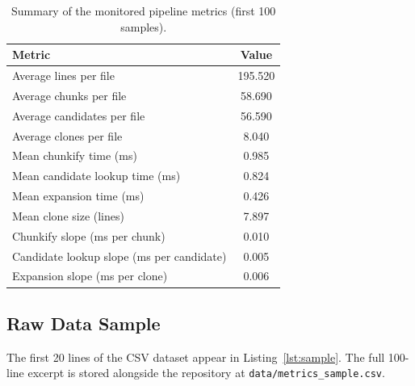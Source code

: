\documentclass[11pt,a4paper]{article}
\begin{document}
\begin{table}[h]
  \centering
  \begin{tabular}{@{}lS@{}}
    \toprule
    Metric & {Value} \\
    \midrule
    Average lines per file & 195.520 \\
    Average chunks per file & 58.690 \\
    Average candidates per file & 56.590 \\
    Average clones per file & 8.040 \\
    Mean chunkify time (ms) & 0.985 \\
    Mean candidate lookup time (ms) & 0.824 \\
    Mean expansion time (ms) & 0.426 \\
    Mean clone size (lines) & 7.897 \\
    Chunkify slope (ms per chunk) & 0.010 \\
    Candidate lookup slope (ms per candidate) & 0.005 \\
    Expansion slope (ms per clone) & 0.006 \\
    \bottomrule
  \end{tabular}
  \caption{Summary of the monitored pipeline metrics (first 100 samples).}
  \label{tab:summary}
\end{table}

\subsection{Raw Data Sample}
The first 20 lines of the CSV dataset appear in Listing~\ref{lst:sample}. The full 100-line excerpt is
stored alongside the repository at \texttt{data/metrics\_sample.csv}.
\end{document}
